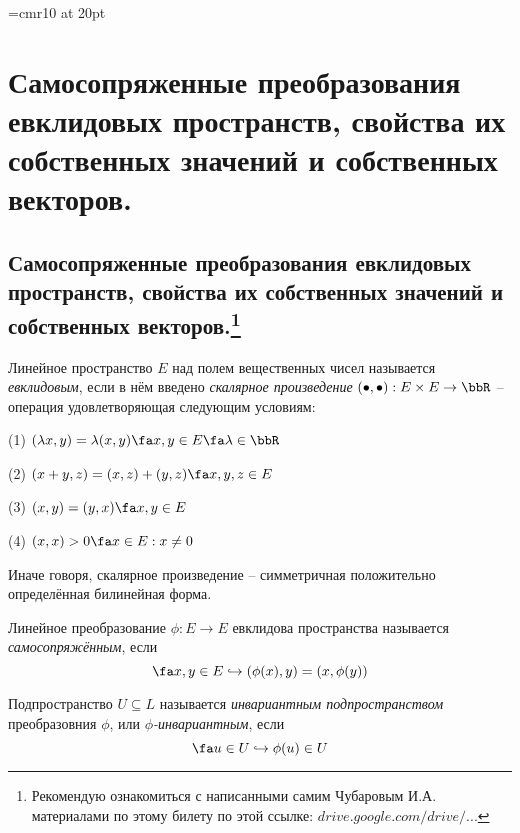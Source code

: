 \font\Large=cmr10 at 20pt
\def\fudge#1{\smash{\hbox{\Large#1}}}
\chapter{Самосопряженные преобразования евклидовых пространств, свойства их собственных значений и собственных векторов.}

\section[Самосопряженные преобразования евклидовых пространств, свойства их собственных значений и собственных векторов.]{Самосопряженные преобразования евклидовых пространств, свойства их собственных значений и собственных векторов.\footnote{Рекомендую ознакомиться с написанными самим Чубаровым И.А. материалами по этому билету по этой ссылке: \href{https://drive.google.com/drive/u/0/folders/0BzuzEyNkpwYDYjVNcE0wa3hqWjA}{$drive.google.com/drive/...$}}}

\begin{defn}
Линейное пространство $E$ над полем вещественных чисел называется \textit{евклидовым}, если в нём введено \textit{скалярное произведение} $(\bullet,\bullet): E\times E \rightarrow \bbR$ -- операция удовлетворяющая следующим условиям:

(1) $(\lambda x,y)=\lambda(x,y) \fa x,y \in E \fa \lambda \in \bbR$

(2) $(x+y,z)=(x,z)+(y,z) \fa x,y,z \in E$

(3) $(x,y)=(y,x) \fa x,y \in E$

(4) $(x,x)>0 \fa x \in E: x \neq 0$
\end{defn}
\begin{notion}
Иначе говоря, скалярное произведение -- симметричная положительно определённая билинейная форма.
\end{notion}

\begin{defn}
  Линейное преобразование $\phi: E \rightarrow E$ евклидова пространства называется \textit{самосопряжённым}, если
  \begin{equation}\label{23.1.selfadjoint}
  \fa x,y \in E \hookrightarrow (\phi(x),y)=(x,\phi(y))
  \end{equation}
\end{defn}

  \begin{defn}
  Подпространство $U \subseteq L$ называется \textit{инвариантным подпространством} преобразовния $\phi$, или \textit{$\phi$-инвариантным}, если
  \begin{equation}\label{23.1.invariant}
  \fa u \in U \hookrightarrow \phi(u) \in U
  \end{equation}
  \end{defn} 
  
